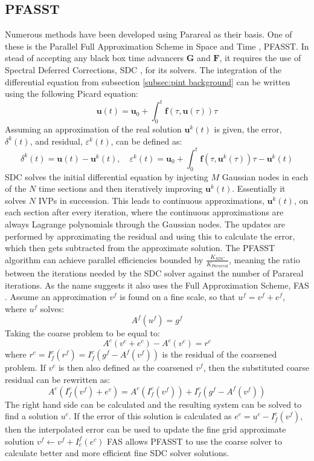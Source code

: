 \subsection{PFASST}
\label{subsec:intro pfasst}
Numerous methods have been developed using Parareal as their basis. One of these is the Parallel Full Approximation Scheme in Space and Time \cite{emmett_toward_2012}, PFASST. In stead of accepting any black box time advancers $\textbf{G}$ and $\textbf{F}$, it requires the use of Spectral Deferred Corrections, SDC \cite{dutt_spectral_2000}, for its solvers. 
\newline
The integration of the differential equation from subsection \ref{subsec:pint background} can be written using the following Picard equation:\[
	\textbf{u}(t) = \textbf{u}_0 + \int^t_0 \textbf{f}(\tau,\textbf{u}(\tau))\tau
\]
Assuming an approximation of the real solution $\textbf{u}^k(t)$ is given, the error, $\delta^k(t)$, and residual, $\varepsilon^k(t)$, can be defined as:\[
	\delta^k(t) = \textbf{u}(t) - \textbf{u}^k(t), \quad
	\varepsilon^k(t) = \textbf{u}_0 + \int^t_0 \textbf{f}(\tau,\textbf{u}^k(\tau))\tau - \textbf{u}^k(t)
\]
SDC solves the initial differential equation by injecting $M$ Gaussian nodes in each of the $N$ time sections and then iteratively improving $\textbf{u}^k(t)$. Essentially it solves $N$ IVPs in succession. This leads to continuous approximations, $\textbf{u}^{k}(t)$, on each section after every iteration, where the continuous approximations are always Lagrange polynomials through the Gaussian nodes. The updates are performed by approximating the residual and using this to calculate the error, which then gets subtracted from the approximate solution. 
The PFASST algorithm can achieve parallel efficiencies bounded by $\frac{K_{SDC}}{K_{Parareal}} $, meaning the ratio between the iterations needed by the SDC solver against the number of Parareal iterations. As the name suggests it also uses the Full Approximation Scheme, FAS \cite{brandt_multi-level_1976}.
\newline
Assume an approximation $v^f$ is found on a fine scale, so that $u^f = v^f + e^f$, where $u^f$ solves:
\[A^f(u^f) = g^f\]
Taking the coarse problem to be equal to:
\[A^c(v^c + e^c)  - A^c(v^c) = r^c\]
where $r^c = I_f^c(r^f) = I_f^c(g^f - A^f(v^f))$ is the residual of the coarsened problem. If $v^c$ is then also defined as the coarsened $v^f$, then the substituted coarse residual can be rewritten as:\[
A^c(I_f^c(v^f) + e^c) = A^c(I_f^c(v^f)) + I_f^c(g^f - A^f(v^f))\]
The right hand side can be calculated and the resulting system can be solved to find a solution $u^c$. If the error of this solution is calculated as $e^c = u^c - I_f^c(v^f)$, then the interpolated error can be used to update the fine grid approximate solution $v^f \leftarrow v^f + I_c^f(e^c)$
\cite{henson_multigrid_2003}
\newline
FAS allows PFASST to use the coarse solver to calculate better and more efficient fine SDC solver solutions. 

